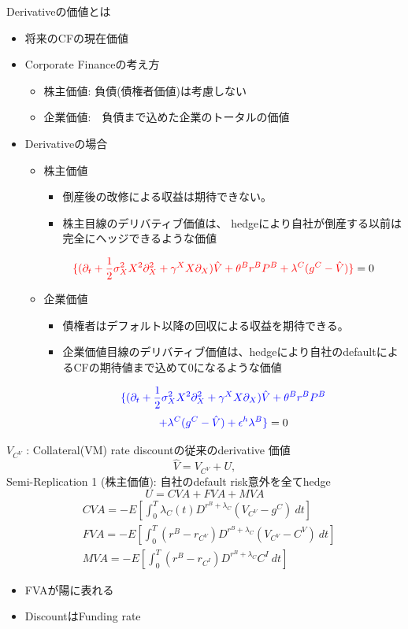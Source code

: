 \documentclass[driverfallback=dvipdfmx,cjk]{beamer}
\begin{document}
\begin{frame}
    Derivativeの価値とは
    \begin{itemize}
        \item 将来のCFの現在価値
        \item Corporate Financeの考え方
        \begin{itemize}
            \item 株主価値: 負債(債権者価値)は考慮しない
            \item 企業価値:　負債まで込めた企業のトータルの価値
        \end{itemize}
        \item Derivativeの場合 
        \begin{itemize}
            \item 株主価値 
            \begin{itemize}
                \item 倒産後の改修による収益は期待できない。
                \item 株主目線のデリバティブ価値は、 hedgeにより自社が倒産する以前は完全にヘッジできるような価値
            \end{itemize}
                $$\textcolor{red}{\{ (\partial_t + \frac{1}{2}\sigma_X^2 X^2 \partial^2_{X}+ \gamma^X X \partial_{X}) \hat{V} + \theta^B r^B P^B + \lambda^C(g^C-\hat{V})  \}}=0$$
            \item 企業価値 
          \begin{itemize}
              \item 債権者はデフォルト以降の回収による収益を期待できる。　
              \item 企業価値目線のデリバティブ価値は、hedgeにより自社のdefaultによるCFの期待値まで込めて0になるような価値
          \end{itemize}  
$$\textcolor{blue}{\{ (\partial_t + \frac{1}{2}\sigma_X^2 X^2 \partial^2_{X}+ \gamma^X X \partial_{X}) \hat{V} + \theta^B r^B P^B}$$
$$\textcolor{blue}{+ \lambda^C(g^C-\hat{V})+\epsilon^h \lambda^B\}}=0$$

        \end{itemize}
    \end{itemize}
\end{frame}

\begin{frame}
    $V_{C^V}$ : Collateral(VM) rate discountの従来のderivative 価値
    $$ \hat{V} = V_{C^V} + U,$$  
    Semi-Replication 1 (株主価値): 自社のdefault risk意外を全てhedge
   $$ U = CVA + FVA + MVA $$
   \begin{align*}
    &CVA = -E[\int_0^T \lambda_C(t) D^{r^B + \lambda_C}(V_{C^V}-g^C) \ dt]\\
    &FVA = -E[\int_0^T (r^B - r_{C^V}) D^{r^B + \lambda_C}(V_{C^V}-C^V) \ dt]\\
    &MVA = -E[\int_0^T (r^B - r_{C^I}) D^{r^B + \lambda_C}C^I \  dt]
   \end{align*}
   \begin{itemize}
       \item FVAが陽に表れる
       \item DiscountはFunding rate 
   \end{itemize}
\end{frame}
\end{document}
